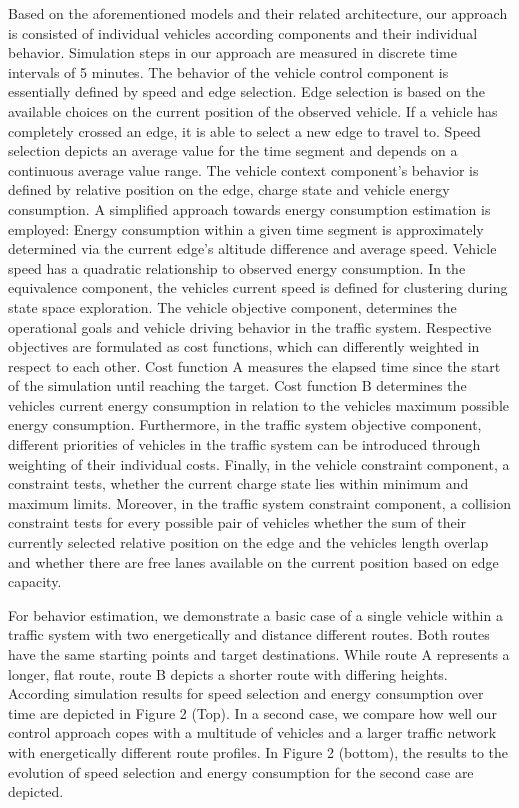\documentclass[conference]{../cls/IEEEtran}
\begin{document}
Based on the aforementioned models and their related architecture, our approach
is consisted of individual vehicles according components and their individual
behavior. Simulation steps in our approach are measured in discrete time
intervals of 5 minutes. The behavior of the vehicle control component is
essentially defined by speed and edge selection. Edge selection is based on the available
choices on the current position of the observed vehicle. If a vehicle has
completely crossed an edge, it is able to select a new edge to travel to. Speed
selection depicts an average value for the time segment and depends on a
continuous average value range. The vehicle context component's behavior is defined by
relative position on the edge, charge state and vehicle energy consumption. A simplified approach towards energy
consumption estimation is employed: Energy consumption within a given time
segment is approximately determined via the current edge's altitude difference 
and average speed. Vehicle speed has a quadratic relationship to observed
energy consumption. In the equivalence component, the vehicles current speed is defined
for clustering during state space exploration. The vehicle objective component,
determines the operational goals and vehicle driving behavior in the traffic
system. Respective objectives are formulated as cost functions, which can
differently weighted in respect to each other. Cost function A measures the
elapsed time since the start of the simulation until reaching the target. Cost function B determines the vehicles current
energy consumption in relation to the vehicles maximum possible energy consumption.
Furthermore, in the traffic system objective component, different priorities of
vehicles in the traffic system can be introduced through weighting of their individual costs.
Finally, in the vehicle constraint component, a constraint tests, whether the
current charge state lies within minimum and maximum limits. Moreover, in the traffic
system constraint component, a collision constraint tests for every possible
pair of vehicles whether the sum of their currently selected relative position
on the edge and the vehicles length overlap and whether there are free lanes
available on the current position based on edge capacity.

For behavior estimation, we demonstrate a basic case of a
single vehicle within a traffic system with two energetically and
distance different routes. Both routes have the same starting points and target
destinations. While route A represents a longer, flat route, route B depicts a
shorter route with differing heights. According simulation results for speed selection and energy consumption over time are depicted in Figure 2 (Top). In a second case, we
compare how well our control approach copes with a multitude of vehicles and a larger traffic network with energetically different route profiles. In Figure 2 (bottom), the 
results to the evolution of speed selection and energy consumption for the
second case are depicted.
\end{document}
